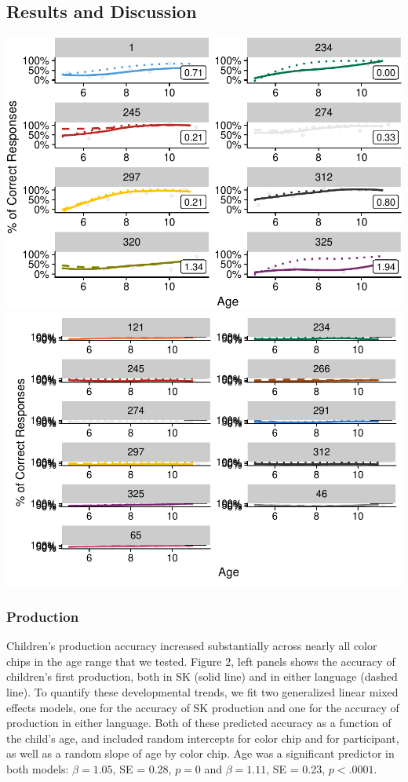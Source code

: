 \documentclass[floatsintext,man]{apa6}
\theoremstyle{definition}
\theoremstyle{definition}
\theoremstyle{definition}
\theoremstyle{remark}
\begin{document}
\subsection{Results and Discussion}\label{results-and-discussion-1}

\includegraphics{amazon_color_files/figure-latex/childfigure-1.pdf}
\includegraphics{amazon_color_files/figure-latex/childfigure-2.pdf}

\subsubsection{Production}\label{production}

Children's production accuracy increased substantially across nearly all
color chips in the age range that we tested. Figure 2, left panels shows
the accuracy of children's first production, both in SK (solid line) and
in either language (dashed line). To quantify these developmental
trends, we fit two generalized linear mixed effects models, one for the
accuracy of SK production and one for the accuracy of production in
either language. Both of these predicted accuracy as a function of the
child's age, and included random intercepts for color chip and for
participant, as well as a random slope of age by color chip. Age was a
significant predictor in both models: \(\beta = 1.05\), SE = 0.28,
\(p = 0\) and \(\beta = 1.11\), SE = 0.23, \(p < .0001\).
\end{document}
